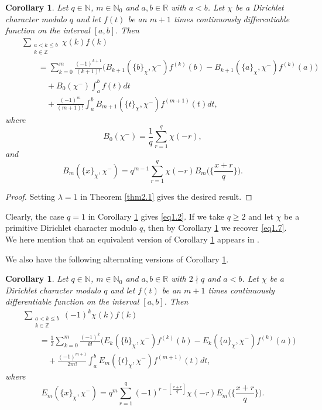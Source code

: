 \documentclass[reqno]{amsart}
\numberwithin{equation}{section}
\newtheorem{corollary}[thm]{Corollary}
\begin{document}
\begin{corollary}\label{cor2.2} Let $q\in\mathbb{N}$, $m\in\mathbb{N}_{0}$ and $a,b\in\mathbb{R}$ with $a<b$. Let $\chi$ be a Dirichlet character modulo $q$ and let $f(t)$ be an $m+1$
times continuously differentiable function on the interval $[a,b]$. Then
\begin{eqnarray}\label{eq2.3}
&&\sum_{\substack{a<k\leqslant b\\k\in\mathbb{Z}}}\chi(k)f(k)\nonumber\\
&&\qquad=\sum_{k=0}^{m}\frac{(-1)^{k+1}}{(k+1)!}\bigl(B_{k+1}(\{b\}_{\chi},\chi^{-})f^{(k)}(b)-B_{k+1}(\{a\}_{\chi},\chi^{-})f^{(k)}(a)\bigl)\nonumber\\
&&\qquad\quad+B_{0}(\chi^{-})\int_{a}^{b}f(t)dt\nonumber\\
&&\qquad\quad+\frac{(-1)^{m}}{(m+1)!}\int_{a}^{b}B_{m+1}(\{t\}_{\chi},\chi^{-})f^{(m+1)}(t)dt,
\end{eqnarray}
where
\begin{equation*}
B_{0}(\chi^{-})=\frac{1}{q}\sum_{r=1}^{q}\chi(-r),
\end{equation*}
and
\begin{equation*}
B_{m}(\{x\}_{\chi},\chi^{-})=q^{m-1}\sum_{r=1}^{q}\chi(-r)B_{m}\biggl(\biggl\{\frac{x+r}{q}\biggl\}\biggl).
\end{equation*}
\end{corollary}

\begin{proof}
Setting $\lambda=1$ in Theorem \ref{thm2.1} gives the desired result.
\end{proof}

Clearly, the case $q=1$ in Corollary \ref{cor2.2} gives \eqref{eq1.2}. If we take $q\geqslant2$ and let $\chi$ be a primitive Dirichlet character modulo $q$, then by Corollary \ref{cor2.2} we recover \eqref{eq1.7}. We here mention that an equivalent version of Corollary \ref{cor2.2} appears in \cite[Proposition 9.4.15]{cohen}.

We also have the following alternating versions of Corollary \ref{cor2.2}.

\begin{corollary}\label{cor2.3} Let $q\in\mathbb{N}$, $m\in\mathbb{N}_{0}$ and $a,b\in\mathbb{R}$ with $2\nmid q$ and $a<b$. Let $\chi$ be a Dirichlet character modulo $q$ and let $f(t)$ be an $m+1$
times continuously differentiable function on the interval $[a,b]$. Then
\begin{eqnarray}\label{eq2.4}
&&\sum_{\substack{a<k\leqslant b\\k\in\mathbb{Z}}}(-1)^{k}\chi(k)f(k)\nonumber\\
&&\qquad=\frac{1}{2}\sum_{k=0}^{m}\frac{(-1)^{k}}{k!}\bigl(E_{k}(\{b\}_{\chi},\chi^{-})f^{(k)}(b)-E_{k}(\{a\}_{\chi},\chi^{-})f^{(k)}(a)\bigl)\nonumber\\
&&\qquad\quad+\frac{(-1)^{m+1}}{2m!}\int_{a}^{b}E_{m}(\{t\}_{\chi},\chi^{-})f^{(m+1)}(t)dt,
\end{eqnarray}
where
\begin{equation*}
E_{m}(\{x\}_{\chi},\chi^{-})=q^{m}\sum_{r=1}^{q}(-1)^{r-[\frac{x+r}{q}]}\chi(-r)E_{m}\biggl(\biggl\{\frac{x+r}{q}\biggl\}\biggl).
\end{equation*}
\end{corollary}
\end{document}
